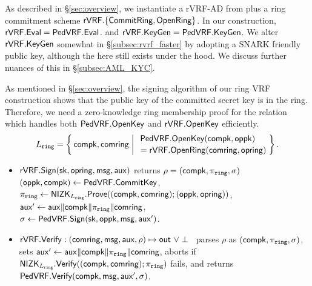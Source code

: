 \smallskip

As described in \S\ref{sec:overview},
we instantiate a rVRF-AD from \PedVRF plus a ring commitment scheme
 $\rVRF.\{ \CommitRing, \OpenRing \}$.
In our construction, $\rVRF.\Eval = \PedVRF.\Eval$.
and $\rVRF.\KeyGen = \PedVRF.\KeyGen$.
We alter $\rVRF.\KeyGen$ somewhat in \S\ref{subsec:rvrf_faster}
by adopting a SNARK friendly public key,
 although the \pk here still exists under the hood.
We discuss further nuances of this in \S\ref{subsec:AML_KYC}.

As mentioned in \S\ref{sec:overview}, the signing algorithm of our ring VRF construction shows that the public key of the committed secret key is in the ring. Therefore, we need a zero-knowledge ring membership proof for the relation \Lring
which handles both $\PedVRF.\OpenKey$ and $\rVRF.\OpenKey$ efficiently.
$$ \Lring = \Setst{ \compk, \comring }{
    \eprint{ \exists \openpk,\openring \textrm{\ s.t.\ } }{}
    \genfrac{}{}{0pt}{}{\PedVRF.\OpenKey(\compk,\openpk) \quad}{\,\, = \rVRF.\OpenRing(\comring,\openring)}
} \mathperiod $$


\def\tmpaux{\aux \doubleplus \compk \doubleplus \piring \doubleplus \comring}
\def\tmpeprintaux{\eprint{\aux'}{\tmpaux}}
\def\tmpindent{\hspace*{5pt}}
\begin{itemize}
\item $\rVRF.\rSign\eprint{ : }{}(\sk,\openring,\msg,\aux)\eprint{ \mapsto \rho}{}$
	returns $\rho = (\compk,\piring,\sigma)$  
	\tmpindent $(\openpk,\compk) \leftarrow \PedVRF.\CommitKey$,  \\
	\tmpindent $\piring \leftarrow \NIZK_{\Lring}.\Prove((\compk,\comring); (\openpk,\openring))$, \\
	\tmpindent $\aux' \leftarrow \tmpaux$,  \\
	\tmpindent $\sigma \leftarrow \PedVRF.\Sign(\sk,\openpk,\msg, \aux')$.
\item $\rVRF.\rVerify : (\comring,\msg,\aux,\rho) \mapsto \Out \,\, \lor \perp$ \,
	parses $\rho$ as $(\compk,\piring,\sigma)$, sets $\aux' \leftarrow \tmpaux$,
	aborts if $\NIZK_{\Lring}.\Verify((\compk,\comring); \piring)$ fails,
	and returns $\PedVRF.\Verify(\compk,\msg, \aux', \sigma)$.
\end{itemize}

